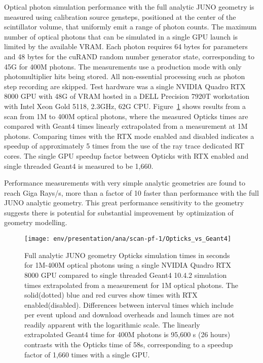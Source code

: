 \documentclass{webofc}
\begin{document}
Optical photon simulation performance with the full analytic JUNO geometry is measured 
using calibration source gensteps, positioned at the center of the scintillator volume, 
that uniformly emit a range of photon counts. 
The maximum number of optical photons that can be simulated in a single GPU launch is
limited by the available VRAM. Each photon requires 64 bytes for parameters  
and 48 bytes for the cuRAND random number generator state, corresponding to 45G for 400M photons.
The measurements use a production mode with only photomultiplier hits being stored.
All non-essential processing such as photon step recording are skipped. Test hardware was a single 
NVIDIA Quadro RTX 8000 GPU with 48G of VRAM hosted in a DELL Precision 7920T workstation with 
Intel Xeon Gold 5118, 2.3GHz, 62G CPU. 
Figure~\ref{scanpf1vs} shows results from a scan from 1M to 400M optical photons, where the measured Opticks 
times are compared with Geant4 times linearly extrapolated from a measurement at 1M photons. 
Comparing times with the RTX mode enabled and disabled indicates a speedup of approximately 5 times
from the use of the ray trace dedicated RT cores.
The single GPU speedup factor between Opticks with RTX enabled and single threaded Geant4 
is measured to be 1,660.   

Performance measurements with very simple analytic geometries are found to reach Giga Rays/s, 
more than a factor of 10 faster than performance with the full JUNO analytic geometry. 
This great performance sensitivity to the geometry suggests there is potential for 
substantial improvement by optimization of geometry modelling. 
%
\begin{figure}
\centering
\texttt{[image: env/presentation/ana/scan-pf-1/Opticks\_vs\_Geant4]}
\caption{Full analytic JUNO geometry Opticks simulation times in seconds for 1M-400M optical photons using a single NVIDIA Quadro RTX 8000 GPU 
compared to single threaded Geant4 10.4.2 simulation times extrapolated from a measurement for 1M optical photons. 
The solid(dotted) blue and red curves show times with RTX enabled(disabled). 
Differences between interval times which include per event upload and download overheads and launch 
times are not readily apparent with the logarithmic scale. The linearly extrapolated Geant4 time for 400M photons is 95,600 s (26 hours) 
contrasts with the Opticks time of 58s, corresponding to a speedup factor of 1,660 times with a single GPU.%
}
\label{scanpf1vs} 
\end{figure}
%
%
%
\end{document}
